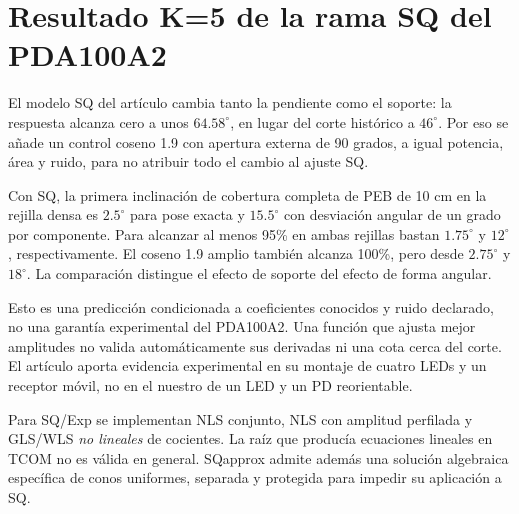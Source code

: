 \documentclass[11pt,a4paper]{article}
\begin{document}
\section{Resultado K=5 de la rama SQ del PDA100A2}
El modelo SQ del artículo cambia tanto la pendiente como el soporte: la respuesta alcanza cero a unos $64.58^\circ$, en lugar del corte histórico a $46^\circ$. Por eso se añade un control coseno 1.9 con apertura externa de 90 grados, a igual potencia, área y ruido, para no atribuir todo el cambio al ajuste SQ.

Con SQ, la primera inclinación de cobertura completa de PEB de 10 cm en la rejilla densa es $2.5^\circ$ para pose exacta y $15.5^\circ$ con desviación angular de un grado por componente. Para alcanzar al menos 95\% en ambas rejillas bastan $1.75^\circ$ y $12^\circ$, respectivamente. El coseno 1.9 amplio también alcanza 100\%, pero desde $2.75^\circ$ y $18^\circ$. La comparación distingue el efecto de soporte del efecto de forma angular.

Esto es una predicción condicionada a coeficientes conocidos y ruido declarado, no una garantía experimental del PDA100A2. Una función que ajusta mejor amplitudes no valida automáticamente sus derivadas ni una cota cerca del corte. El artículo aporta evidencia experimental en su montaje de cuatro LEDs y un receptor móvil, no en el nuestro de un LED y un PD reorientable.

Para SQ/Exp se implementan NLS conjunto, NLS con amplitud perfilada y GLS/WLS \emph{no lineales} de cocientes. La raíz que producía ecuaciones lineales en TCOM no es válida en general. SQapprox admite además una solución algebraica específica de conos uniformes, separada y protegida para impedir su aplicación a SQ.
\end{document}
